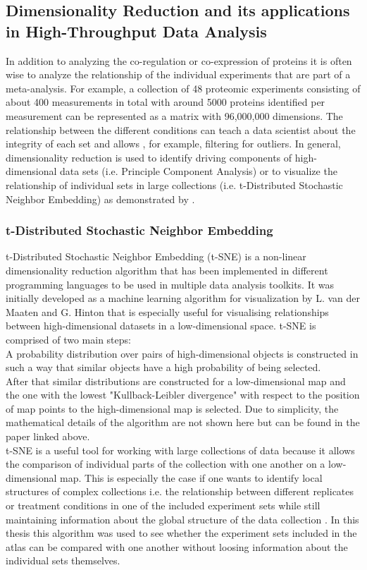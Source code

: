 \subsection{Dimensionality Reduction and its applications in High-Throughput Data Analysis}
In addition to analyzing the co-regulation or co-expression of proteins it is often wise to analyze the relationship of the individual experiments that are part of a meta-analysis. For example, a collection of 48 proteomic experiments consisting of about 400 measurements in total with around 5000 proteins identified per measurement can be represented as a matrix with 96,000,000 dimensions. The relationship between the different conditions can teach a data scientist about the integrity of each set and allows , for example, filtering for outliers. In general, dimensionality reduction is used to identify driving components of high-dimensional data sets (i.e. Principle Component Analysis) or to visualize the relationship of individual sets in large collections (i.e. t-Distributed Stochastic Neighbor Embedding) as demonstrated by \cite{Kustatscher.2019}.

\subsubsection{t-Distributed Stochastic Neighbor Embedding}
t-Distributed Stochastic Neighbor Embedding (t-SNE) is a non-linear dimensionality reduction algorithm that has been implemented in different programming languages to be used in multiple data analysis toolkits. It was initially developed as a machine learning algorithm for visualization by L. van der Maaten and G. Hinton \citep{vanderMaaten.2008} that is especially useful for visualising relationships between high-dimensional datasets in a low-dimensional space. t-SNE is comprised of two main steps:\\
A probability distribution over pairs of high-dimensional objects is constructed in such a way that similar objects have a high probability of being selected.\\
After that similar distributions are constructed for a low-dimensional map and the one with the lowest "Kullback-Leibler divergence" with respect to the position of map points to the high-dimensional map is selected. Due to simplicity, the mathematical details of the algorithm are not shown here but can be found in the paper linked above.\\
t-SNE is a useful tool for working with large collections of data because it allows the comparison of individual parts of the collection with one another on a low-dimensional map. This is especially the case if one wants to identify local structures of complex collections i.e. the relationship between different replicates or treatment conditions in one of the included experiment sets while still maintaining information about the global structure of the data collection \cite{Kobak.2019}. In this thesis this algorithm was used to see whether the experiment sets included in the atlas can be compared with one another without loosing information about the individual sets themselves.